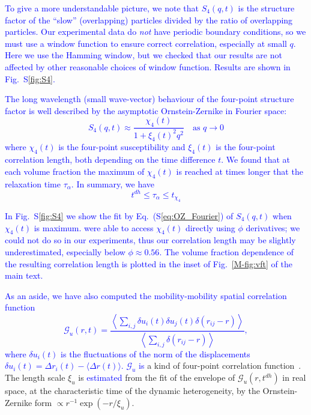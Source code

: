 \documentclass[prl,twocolumn,notitlepage]{revtex4-1}
\begin{document}
\textcolor{blue}{To give a more understandable picture, we note that $S_4(q,t)$ is the structure factor of the ``slow'' (overlapping) particles divided by the ratio of overlapping particles. Our experimental data do \emph{not} have periodic boundary conditions, so we must use a window function to ensure correct correlation, especially at small $q$. Here we use the Hamming window, but we checked that our results are not affected by other reasonable choices of window function. Results are shown in Fig.~S\ref{fig:S4}.}

\textcolor{blue}{The long wavelength (small wave-vector) behaviour of the four-point structure factor is well described by the asymptotic Ornstein-Zernike in Fourier space:
\begin{equation}
	S_4(q,t) \approx \frac{\chi_4(t)}{1+\xi_4(t)^2 q^2} \quad \text{as } q\rightarrow 0
	\label{eq:OZ_Fourier}
\end{equation}
where $\chi_4(t)$ is the four-point susceptibility and $\xi_4(t)$ is the four-point correlation length, both depending on the time difference $t$. We found that at each volume fraction the maximum of $\chi_4(t)$ is reached at times longer that the relaxation time $\tau_\alpha$. In summary, we have
\begin{equation}
t^{dh} \leq \tau_\alpha \leq t_{\chi_4}
\end{equation}}

\textcolor{blue}{In Fig.~S\ref{fig:S4} we show the fit by Eq.~(S\ref{eq:OZ_Fourier}) of $S_4(q,t)$ when $\chi_4(t)$ is maximum. \citet{Flenner2011} were able to access $\chi_4(t)$ directly using $\phi$ derivatives; we could not do so in our experiments, thus our correlation length may be slightly underestimated, especially below $\phi\approx 0.56$. The volume fraction dependence of the resulting correlation length is plotted in the inset of Fig.~\ref{M-fig:vft} of the main text.}

\textcolor{blue}{As an aside, we have also computed the mobility-mobility spatial correlation function~\cite{Donati1999}
\begin{equation}
	\mathcal{G}_u(r,t) = \frac{
		\left\langle \sum_{i,j}{\delta u_i(t) \delta u_j(t) \delta(r_{ij} -r)} \right\rangle 
	}{
		\left\langle \sum_{i,j}{\delta(r_{ij} -r)} \right\rangle
	},
	\label{eq:mobility_correl}
\end{equation}
where $\delta u_i(t)$ is the fluctuations of the norm of the displacements $\delta u_i(t) = \Delta r_i(t)-\langle\Delta r(t)\rangle$. $\mathcal{G}_u$ is} a kind of four-point correlation function~\cite{cavagna2009supercooled}. The length scale $\xi_u$ is \textcolor{blue}{estimated} from the fit of the envelope of $\mathcal{G}_u(r,t^{dh})$ in real space, at the characteristic time of the dynamic heterogeneity, by the Ornstein-Zernike form $\propto r^{-1}\exp( -r/\xi_u)$. 
\end{document}
